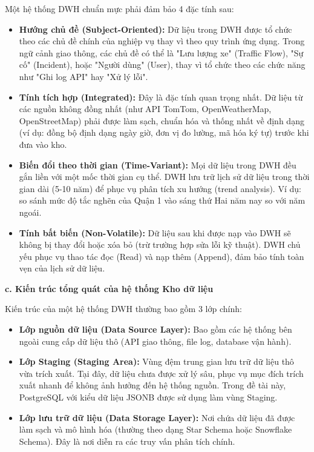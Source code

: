 Một hệ thống DWH chuẩn mực phải đảm bảo 4 đặc tính sau:
\begin{itemize}
    \item \textbf{Hướng chủ đề (Subject-Oriented):} Dữ liệu trong DWH được tổ chức theo các chủ đề chính của nghiệp vụ thay vì theo quy trình ứng dụng. Trong ngữ cảnh giao thông, các chủ đề có thể là "Lưu lượng xe" (Traffic Flow), "Sự cố" (Incident), hoặc "Người dùng" (User), thay vì tổ chức theo các chức năng như "Ghi log API" hay "Xử lý lỗi".
    \item \textbf{Tính tích hợp (Integrated):} Đây là đặc tính quan trọng nhất. Dữ liệu từ các nguồn không đồng nhất (như API TomTom, OpenWeatherMap, OpenStreetMap) phải được làm sạch, chuẩn hóa và thống nhất về định dạng (ví dụ: đồng bộ định dạng ngày giờ, đơn vị đo lường, mã hóa ký tự) trước khi đưa vào kho.
    \item \textbf{Biến đổi theo thời gian (Time-Variant):} Mọi dữ liệu trong DWH đều gắn liền với một mốc thời gian cụ thể. DWH lưu trữ lịch sử dữ liệu trong thời gian dài (5-10 năm) để phục vụ phân tích xu hướng (trend analysis). Ví dụ: so sánh mức độ tắc nghẽn của Quận 1 vào sáng thứ Hai năm nay so với năm ngoái.
    \item \textbf{Tính bất biến (Non-Volatile):} Dữ liệu sau khi được nạp vào DWH sẽ không bị thay đổi hoặc xóa bỏ (trừ trường hợp sửa lỗi kỹ thuật). DWH chủ yếu phục vụ thao tác đọc (Read) và nạp thêm (Append), đảm bảo tính toàn vẹn của lịch sử dữ liệu.
\end{itemize}

\textbf{c. Kiến trúc tổng quát của hệ thống Kho dữ liệu}

Kiến trúc của một hệ thống DWH thường bao gồm 3 lớp chính:
\begin{itemize}
    \item \textbf{Lớp nguồn dữ liệu (Data Source Layer):} Bao gồm các hệ thống bên ngoài cung cấp dữ liệu thô (API giao thông, file log, database vận hành).
    \item \textbf{Lớp Staging (Staging Area):} Vùng đệm trung gian lưu trữ dữ liệu thô vừa trích xuất. Tại đây, dữ liệu chưa được xử lý sâu, phục vụ mục đích trích xuất nhanh để không ảnh hưởng đến hệ thống nguồn. Trong đề tài này, PostgreSQL với kiểu dữ liệu JSONB được sử dụng làm vùng Staging.
    \item \textbf{Lớp lưu trữ dữ liệu (Data Storage Layer):} Nơi chứa dữ liệu đã được làm sạch và mô hình hóa (thường theo dạng Star Schema hoặc Snowflake Schema). Đây là nơi diễn ra các truy vấn phân tích chính.
\end{itemize}

